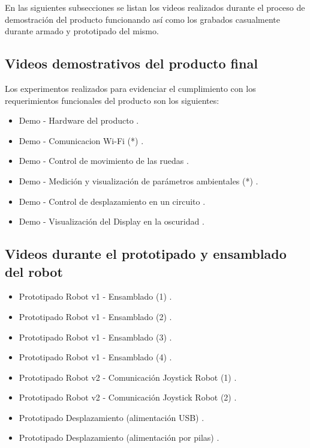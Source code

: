 En las siguientes subsecciones se listan los videos realizados durante el proceso de demostración del producto funcionando así como los grabados casualmente durante armado y prototipado del mismo.


\subsection{Videos demostrativos del producto final}

Los experimentos realizados para evidenciar el cumplimiento con los requerimientos funcionales del producto son los siguientes:
\begin{itemize}
	\item Demo - Hardware del producto \cite{Demo_Hardware}.
	\item Demo - Comunicacion Wi-Fi (*) \cite{Demo_ComWifi}.
	\item Demo - Control de movimiento de las ruedas \cite{Demo_Control_Movimiento_1}.
	\item Demo - Medición y visualización de parámetros ambientales (*) \cite{Demo_Mediciones}.
	\item Demo - Control de desplazamiento en un circuito \cite{Demo_Control_Movimiento_2}.
	\item Demo - Visualización del Display en la oscuridad \cite{Demo_Display_Oscuridad}.
	
\end{itemize}


\subsection{Videos durante el prototipado y ensamblado del robot}

\begin{itemize}
	\item Prototipado Robot v1 - Ensamblado  (1) \cite{Prototipado_Ensamblado_1}.	
	\item Prototipado Robot v1 - Ensamblado  (2) \cite{Prototipado_Ensamblado_2}.
	\item Prototipado Robot v1 - Ensamblado  (3) \cite{Prototipado_Ensamblado_3}.
	\item Prototipado Robot v1 - Ensamblado  (4) \cite{Prototipado_Ensamblado_4}.
	\item Prototipado Robot v2 - Comunicación Joystick Robot (1) \cite{Prototipado_Comunicacion_JoystickRobot1}.
	\item Prototipado Robot v2 - Comunicación Joystick Robot (2) \cite{Prototipado_Comunicacion_JoystickRobot2}.
	\item Prototipado Desplazamiento (alimentación USB) \cite{Prototipado_Desplazamiento_USB}.
	\item Prototipado Desplazamiento (alimentación por pilas) \cite{Prototipado_Desplazamiento_Pilas}.

\end{itemize}


